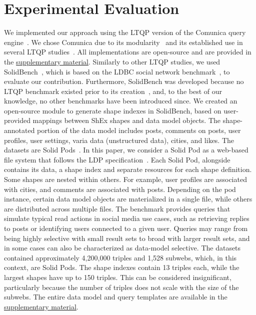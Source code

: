 \section{Experimental Evaluation}\label{sec:experiment}

We implemented our approach using the LTQP version of the Comunica query engine~\cite{taelman_iswc_resources_comunica_2018}.
We chose Comunica due to its modularity~\cite{taelman_swj_componentsjs_2022} and its established use in several LTQP studies~\cite{Bogaerts2021LinkTW, Taelman2023, eschauzier_quweda_linkqueue_2023, Hanski2024, eschauzier_amw_rcubemetric_2024, tam2024opportunitiesshapebasedoptimizationlink}.
All implementations are open-source and are provided in the \hyperref[sec:supplementalMaterial]{supplementary material}.
Similarly to other LTQP studies, we used SolidBench~\cite{Taelman2023}, which is based on the LDBC social network benchmark~\cite{Angles2020}, to evaluate our contribution.
Furthermore, SolidBench was developed because no LTQP benchmark existed prior to its creation~\cite{hartig2018linked, Taelman2023}, and, to the best of our knowledge, no other benchmarks have been introduced since.
We created an open-source module to generate shape indexes in SolidBench, based on user-provided mappings between ShEx shapes and data model objects.
The shape-annotated portion of the data model includes posts, comments on posts, user profiles, user settings, varia data (unstructured data), cities, and likes.
The datasets are Solid Pods~\cite{sambra_solid_2016, dedecker2022s}.
In this paper, we consider a Solid Pod as a web-based file system that follows the LDP specification~\cite{w3LinkedData}.
Each Solid Pod, alongside contains its data, a shape index and separate resources for each shape definition.
Some shapes are nested within others. 
For example, user profiles are associated with cities, and comments are associated with posts.
Depending on the pod instance, certain data model objects are materialized in a single file, while others are distributed across multiple files.
The benchmark provides queries that simulate typical read actions in social media use cases, such as retrieving replies to posts or identifying users connected to a given user. 
Queries may range from being highly selective with small result sets to broad with larger result sets, and in some cases can also be characterized as data-model selective.
The datasets contained approximately 4,200,000 triples and 1,528 subwebs, which, in this context, are Solid Pods.
The shape indexes contain 13 triples each, while the largest shapes have up to 150 triples. 
This can be considered insignificant, particularly because the number of triples does not scale with the size of the subwebs.
The entire data model and query templates are available in the \hyperref[sec:supplementalMaterial]{supplementary material}.

